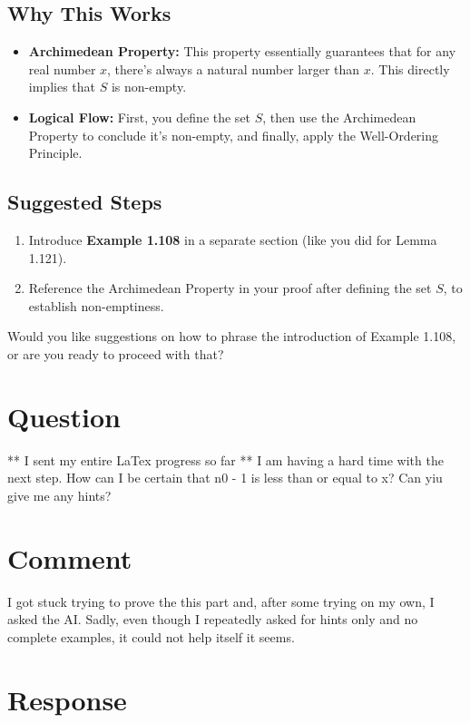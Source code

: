 \documentclass{article}
\begin{document}
\subsection*{Why This Works}

\begin{itemize}
    \item \textbf{Archimedean Property:} This property essentially guarantees that for any real number \( x \), there’s always a natural number larger than \( x \). This directly implies that \( S \) is non-empty.
    \item \textbf{Logical Flow:} First, you define the set \( S \), then use the Archimedean Property to conclude it's non-empty, and finally, apply the Well-Ordering Principle.
\end{itemize}

\subsection*{Suggested Steps}

\begin{enumerate}
    \item Introduce \textbf{Example 1.108} in a separate section (like you did for Lemma 1.121).
    \item Reference the Archimedean Property in your proof after defining the set \( S \), to establish non-emptiness.
\end{enumerate}

Would you like suggestions on how to phrase the introduction of Example 1.108, or are you ready to proceed with that?

\section*{Question}
** I sent my entire LaTex progress so far **
I am having a hard time with the next step. How can I be certain that n0 - 1 is less than or equal to x? Can yiu give me any hints?

\section*{Comment}
I got stuck trying to prove the this part and, after some trying on my own, I asked the AI. Sadly, even though I repeatedly asked for hints only and no complete examples, it could not help itself it seems. 

\section*{Response}
\end{document}
